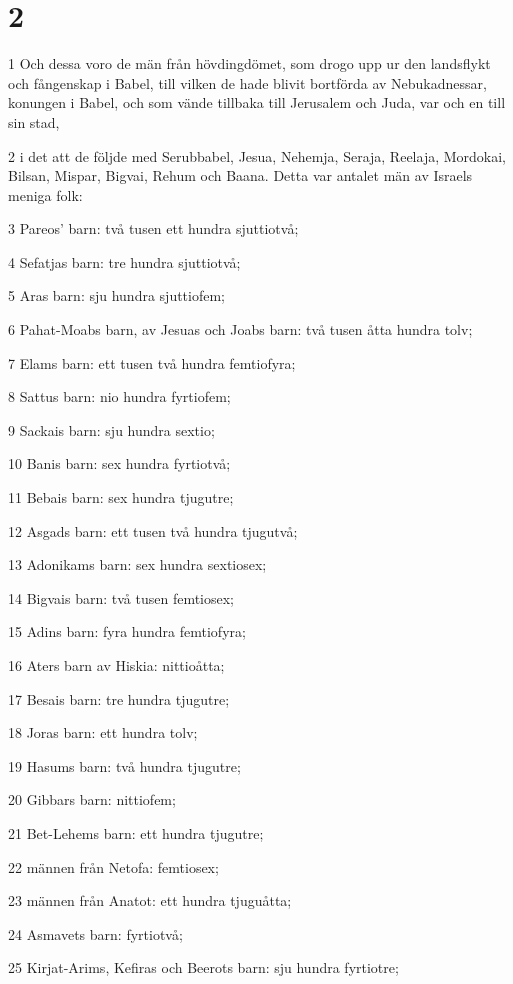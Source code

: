 \chapter{2}

\par 1 Och dessa voro de män från hövdingdömet, som drogo upp ur den landsflykt och fångenskap i Babel, till vilken de hade blivit bortförda av Nebukadnessar, konungen i Babel, och som vände tillbaka till Jerusalem och Juda, var och en till sin stad,
\par 2 i det att de följde med Serubbabel, Jesua, Nehemja, Seraja, Reelaja, Mordokai, Bilsan, Mispar, Bigvai, Rehum och Baana. Detta var antalet män av Israels meniga folk:
\par 3 Pareos' barn: två tusen ett hundra sjuttiotvå;
\par 4 Sefatjas barn: tre hundra sjuttiotvå;
\par 5 Aras barn: sju hundra sjuttiofem;
\par 6 Pahat-Moabs barn, av Jesuas och Joabs barn: två tusen åtta hundra tolv;
\par 7 Elams barn: ett tusen två hundra femtiofyra;
\par 8 Sattus barn: nio hundra fyrtiofem;
\par 9 Sackais barn: sju hundra sextio;
\par 10 Banis barn: sex hundra fyrtiotvå;
\par 11 Bebais barn: sex hundra tjugutre;
\par 12 Asgads barn: ett tusen två hundra tjugutvå;
\par 13 Adonikams barn: sex hundra sextiosex;
\par 14 Bigvais barn: två tusen femtiosex;
\par 15 Adins barn: fyra hundra femtiofyra;
\par 16 Aters barn av Hiskia: nittioåtta;
\par 17 Besais barn: tre hundra tjugutre;
\par 18 Joras barn: ett hundra tolv;
\par 19 Hasums barn: två hundra tjugutre;
\par 20 Gibbars barn: nittiofem;
\par 21 Bet-Lehems barn: ett hundra tjugutre;
\par 22 männen från Netofa: femtiosex;
\par 23 männen från Anatot: ett hundra tjuguåtta;
\par 24 Asmavets barn: fyrtiotvå;
\par 25 Kirjat-Arims, Kefiras och Beerots barn: sju hundra fyrtiotre;

